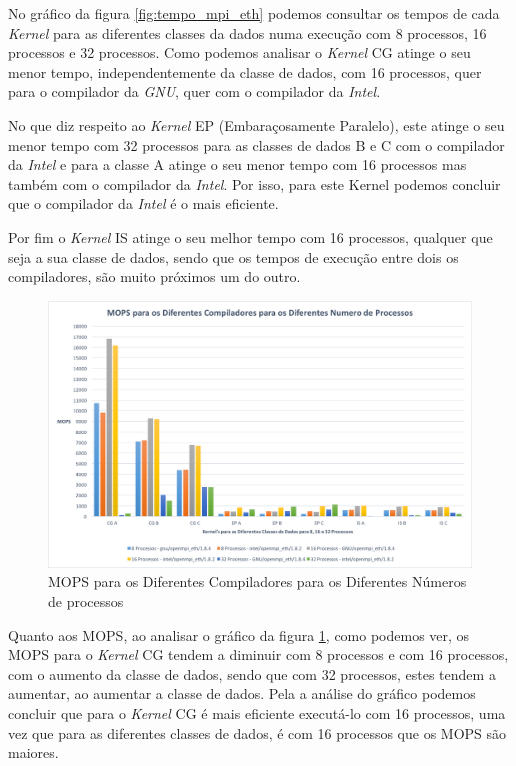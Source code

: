 \documentclass[conference,compsoc]{IEEEtran}
\begin{document}
No gráfico da figura \ref{fig:tempo_mpi_eth} podemos consultar os tempos de cada \textit{Kernel} para as diferentes classes da dados numa execução com 8 processos, 16 processos e 32 processos. Como podemos analisar o \textit{Kernel} CG atinge o seu menor tempo, independentemente da classe de dados, com 16 processos, quer para o compilador da \textit{GNU}, quer com o compilador da \textit{Intel}. 

No que diz respeito ao \textit{Kernel} EP (Embaraçosamente Paralelo), este atinge o seu menor tempo com 32 processos para as classes de dados B e C com o compilador da \textit{Intel} e para a classe A atinge o seu menor tempo com 16 processos mas também com o compilador da \textit{Intel}. Por isso, para este Kernel podemos concluir que o compilador da \textit{Intel} é o mais eficiente.

Por fim o \textit{Kernel} IS atinge o seu melhor tempo com 16 processos, qualquer que seja a sua classe de dados, sendo que os tempos de execução entre dois os compiladores, são muito próximos um do outro.

\begin{figure}[h!]
\centering
\includegraphics[scale=0.325]{MPI/mops_dif_compiladores_dif_num_proc.png}
\caption{MOPS para os Diferentes Compiladores para os Diferentes Números de processos}
\label{fig:mops_mpi_eth}
\end{figure}

Quanto aos MOPS, ao analisar o gráfico da figura \ref{fig:mops_mpi_eth}, como podemos ver, os MOPS para o \textit{Kernel} CG tendem a diminuir com 8 processos e com 16 processos, com o aumento da classe de dados, sendo que com 32 processos, estes tendem a aumentar, ao aumentar a classe de dados. Pela a análise do gráfico podemos concluir que para o \textit{Kernel} CG é mais eficiente executá-lo com 16 processos, uma vez que para as diferentes classes de dados, é com 16 processos que os MOPS são maiores.
\end{document}
